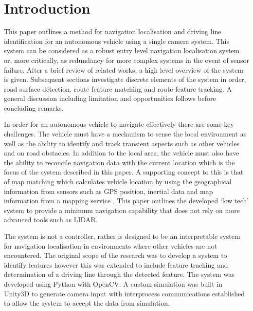 \documentclass[]{aiaa-tc}%
\begin{document}

\newpage
\section{Introduction} \label{sect:intro}

This paper outlines a method for navigation localisation and driving line identification for an autonomous vehicle using a single camera system. This system can be considered as a robust entry level navigation localisation system or, more critically, as redundancy for more complex systems in the event of sensor failure. After a brief review of related works, a high level overview of the system is given. Subsequent sections investigate discrete elements of the system in order, road surface detection, route feature matching and route feature tracking. A general discussion including limitation and opportunities follows before concluding remarks.

In order for an autonomous vehicle to navigate effectively there are some key challenges. The vehicle must have a mechanism to sense the local environment as well as the ability to identify and track transient aspects such as other vehicles and on road obstacles. In addition to the local area, the vehicle must also have the ability to reconcile navigation data with the current location which is the focus of the system described in this paper. A supporting concept to this is that of map matching which calculates vehicle location by using the geographical information from sensors such as GPS position, inertial data and map information from a mapping service \citep{keyTechSelfDriving}. This paper outlines the developed `low tech' system to provide a minimum navigation capability that does not rely on more advanced tools such as LIDAR. 

The system is not a controller, rather is designed to be an interpretable system for navigation localisation in environments where other vehicles are not encountered. The original scope of the research was to develop a system to identify features however this was extended to include feature tracking and determination of a driving line through the detected feature. The system was developed using Python with OpenCV. A custom simulation was built in Unity3D to generate camera input with interprocess communications established to allow the system to accept the data from simulation.
\end{document}
